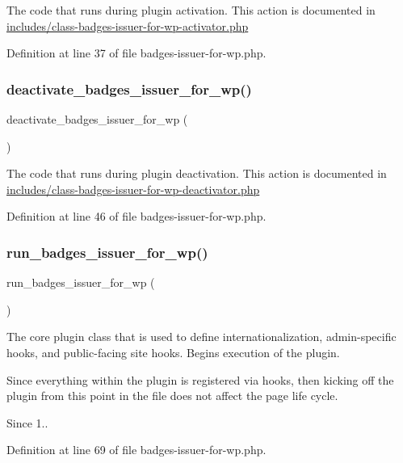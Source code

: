 The code that runs during plugin activation. This action is documented in \hyperlink{class-badges-issuer-for-wp-activator_8php}{includes/class-\/badges-\/issuer-\/for-\/wp-\/activator.\+php} 

Definition at line 37 of file badges-\/issuer-\/for-\/wp.\+php.

\mbox{\label{badges-issuer-for-wp_8php_adae7a14803fba2abc9e49870399de3be}} 
\subsubsection{\texorpdfstring{deactivate\+\_\+badges\+\_\+issuer\+\_\+for\+\_\+wp()}{deactivate\_badges\_issuer\_for\_wp()}}
{\footnotesize\ttfamily deactivate\+\_\+badges\+\_\+issuer\+\_\+for\+\_\+wp (\begin{DoxyParamCaption}{ }\end{DoxyParamCaption})}

The code that runs during plugin deactivation. This action is documented in \hyperlink{class-badges-issuer-for-wp-deactivator_8php}{includes/class-\/badges-\/issuer-\/for-\/wp-\/deactivator.\+php} 

Definition at line 46 of file badges-\/issuer-\/for-\/wp.\+php.

\mbox{\label{badges-issuer-for-wp_8php_a7d43eb2e7ca7c2326af471de82a4e126}} 
\subsubsection{\texorpdfstring{run\+\_\+badges\+\_\+issuer\+\_\+for\+\_\+wp()}{run\_badges\_issuer\_for\_wp()}}
{\footnotesize\ttfamily run\+\_\+badges\+\_\+issuer\+\_\+for\+\_\+wp (\begin{DoxyParamCaption}{ }\end{DoxyParamCaption})}

The core plugin class that is used to define internationalization, admin-\/specific hooks, and public-\/facing site hooks. Begins execution of the plugin.

Since everything within the plugin is registered via hooks, then kicking off the plugin from this point in the file does not affect the page life cycle.

\begin{DoxySince}{Since}
1.. 
\end{DoxySince}


Definition at line 69 of file badges-\/issuer-\/for-\/wp.\+php.

